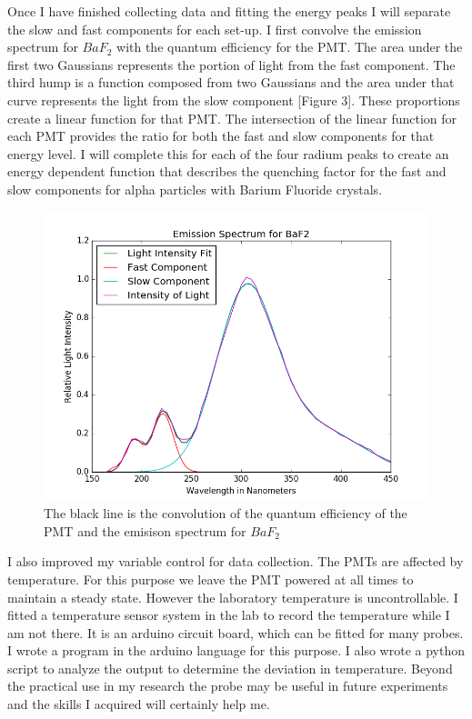 \documentclass{article}
\begin{document}
Once I have finished collecting data and fitting the energy peaks I will separate the slow and fast components for each set-up. I first convolve the emission spectrum for $BaF_2$ with the quantum efficiency for the PMT. The area under the first two Gaussians represents the portion of light from the fast component. The third hump is a function composed from two Gaussians and the area under that curve represents the light from the slow component [Figure 3]. These proportions create a linear function for that PMT. The intersection of the linear function for each PMT provides the ratio for both the fast and slow components for that energy level. I will complete this for each of the four radium peaks to create an energy dependent function that describes the quenching factor for the fast and slow components for alpha particles with Barium Fluoride crystals.

\begin{figure}[H]
  \centering
  \begin{minipage}[b]{0.4\textwidth}
    \includegraphics[width=\textwidth]{FitsBaF2.png}
    \caption{The black line is the convolution of the quantum efficiency of the PMT and the emisison spectrum for $BaF_2$ }
  \end{minipage}
\end{figure}

I also improved my variable control for data collection. The PMTs are affected by temperature. For this purpose we leave the PMT powered at all times to maintain a steady state. However the laboratory temperature is uncontrollable. I fitted a temperature sensor system in the lab to record the temperature while I am not there. It is an arduino circuit board, which can be fitted for many probes. I wrote a program in the arduino language for this purpose. I also wrote a python script to analyze the output to determine the deviation in temperature. Beyond the practical use in my research the probe may be useful in future experiments and the skills I acquired will certainly help me. 
\end{document}
